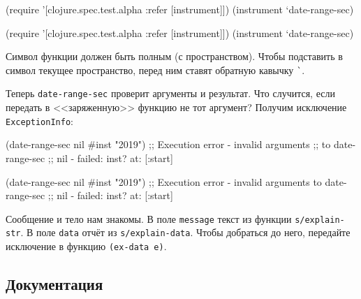 \begin{english}
  \begin{clojure}
(require '[clojure.spec.test.alpha
           :refer [instrument]])
(instrument `date-range-sec)
  \end{clojure}
\end{english}

\else

\begin{english}
  \begin{clojure}
(require '[clojure.spec.test.alpha :refer [instrument]])
(instrument `date-range-sec)
  \end{clojure}
\end{english}

\fi


Символ функции должен быть полным (с пространством). Чтобы подставить в символ
текущее пространство, перед ним ставят обратную кавычку \verb|`|.

Теперь \verb|date-range-sec| проверит аргументы и результат. Что случится,
если передать в <<заряженную>> функцию не тот аргумент? Получим исключение
\verb|ExceptionInfo|:

\ifx\DEVICETYPE\MOBILE

\begin{english}
  \begin{clojure}
(date-range-sec nil #inst "2019")
;; Execution error - invalid arguments
;; to date-range-sec
;; nil - failed: inst? at: [:start]
  \end{clojure}
\end{english}

\else

\begin{english}
  \begin{clojure}
(date-range-sec nil #inst "2019")
;; Execution error - invalid arguments to date-range-sec
;; nil - failed: inst? at: [:start]
  \end{clojure}
\end{english}

\fi


Сообщение и тело нам знакомы. В поле \verb|message| текст из функции
\verb|s/explain-str|. В поле \verb|data| отчёт из
\verb|s/explain-data|. Чтобы добраться до него, передайте исключение в функцию
\verb|(ex-data e)|.

\subsection{Документация}


